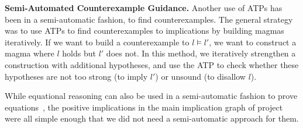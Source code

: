 \textbf{Semi-Automated Counterexample Guidance.}  Another use of ATPs has been in a semi-automatic fashion, to find counterexamples.
The general strategy was to use ATPs to find counterexamples to implications by building magmas iteratively.
If we want to build a counterexample to $l \models l'$, we want to construct a magma where $l$ holds but $l'$ does not.
In this method, we iteratively strengthen a construction with additional hypotheses, and use the ATP to check whether these hypotheses are not too strong (to imply $l'$) or unsound (to disallow $l$).


While equational reasoning can also be used in a semi-automatic fashion to prove equations~\cite{DBLP:journals/pacmpl/KoehlerGBGTS24}, the positive implications in the main implication graph of project were all simple enough that we did not need a semi-automatic approach for them.





